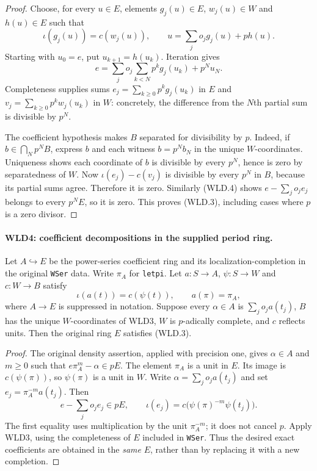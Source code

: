 \documentclass[11pt,a4paper]{article}
\numberwithin{equation}{section}
\theoremstyle{remark}\newtheorem{remark}[theorem]{Remark}
\begin{document}
\begin{proof}
Choose, for every $u\in E$, elements $g_j(u)\in E$, $w_j(u)\in W$
and $h(u)\in E$ such that
\[
 \iota(g_j(u))=c(w_j(u)),\qquad
                  u=\sum_j o_jg_j(u)+ph(u).
\]
Starting with $u_0=e$, put $u_{k+1}=h(u_k)$. Iteration gives
\[
 e=\sum_j o_j\sum_{k<N}p^kg_j(u_k)+p^Nu_N.                 \tag{WLD.4}
\]
Completeness supplies sums
$e_j=\sum_{k\ge0}p^kg_j(u_k)$ in $E$ and
$v_j=\sum_{k\ge0}p^kw_j(u_k)$ in $W$: concretely, the difference
from the $N$th partial sum is divisible by $p^N$.

The coefficient hypothesis makes $B$ separated for divisibility by
$p$. Indeed, if $b\in\bigcap_Np^NB$, express $b$ and each witness
$b=p^Nb_N$ in the unique $W$-coordinates. Uniqueness shows each
coordinate of $b$ is divisible by every $p^N$, hence is zero by
separatedness of $W$. Now
$\iota(e_j)-c(v_j)$ is divisible by every $p^N$ in $B$, because its
partial sums agree. Therefore it is zero. Similarly (WLD.4) shows
$e-\sum_j o_je_j$ belongs to every $p^NE$, so it is zero.
This proves (WLD.3), including cases where $p$ is a zero divisor.
\end{proof}

\paragraph{WLD4: coefficient decompositions in the supplied period ring.}
\label{claim:WLD4}
Let $A\hookrightarrow E$ be the power-series coefficient ring and its
localization-completion in the original \texttt{WSer} data. Write
$\pi_A$ for \texttt{letpi}. Let $a:S\to A$, $\psi:S\to W$ and
$c:W\to B$ satisfy
\[
       \iota(a(t))=c(\psi(t)),\qquad a(\pi)=\pi_A,
                                                               \tag{WLD.5}
\]
where $A\to E$ is suppressed in notation. Suppose every $\alpha\in A$
is $\sum_j o_ja(t_j)$, $B$ has the unique $W$-coordinates of WLD3,
$W$ is $p$-adically complete, and $c$ reflects units. Then the
original ring $E$ satisfies (WLD.3).

\begin{proof}
The original density assertion, applied with precision one, gives
$\alpha\in A$ and $m\ge0$ such that
$e\pi_A^m-\alpha\in pE$. The element $\pi_A$ is a unit in $E$.
Its image is $c(\psi(\pi))$, so $\psi(\pi)$ is a unit in $W$.
Write $\alpha=\sum_j o_ja(t_j)$ and set
$e_j=\pi_A^{-m}a(t_j)$. Then
\[
 e-\sum_j o_je_j\in pE,\qquad
 \iota(e_j)=c\bigl(\psi(\pi)^{-m}\psi(t_j)\bigr).
\]
The first equality uses multiplication by the unit $\pi_A^{-m}$;
it does not cancel $p$. Apply WLD3, using the completeness of $E$
included in \texttt{WSer}. Thus the desired exact coefficients
are obtained in the \emph{same} $E$, rather than by replacing it with
a new completion.
\end{proof}
\end{document}

